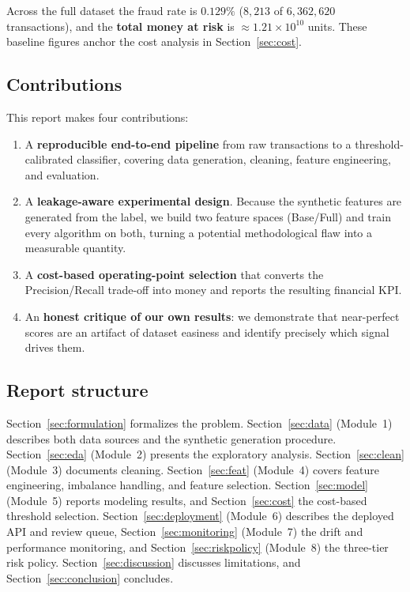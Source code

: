\documentclass{article}
\begin{document}
Across the full dataset the fraud rate is $0.129\%$ ($8{,}213$ of
$6{,}362{,}620$ transactions), and the \textbf{total money at risk} is
$\approx 1.21\times 10^{10}$ units. These baseline figures anchor the
cost analysis in Section~\ref{sec:cost}.

\subsection{Contributions}
This report makes four contributions:
\begin{enumerate}
    \item A \textbf{reproducible end-to-end pipeline} from raw
    transactions to a threshold-calibrated classifier, covering data
    generation, cleaning, feature engineering, and evaluation.
    \item A \textbf{leakage-aware experimental design}. Because the
    synthetic features are generated from the label, we build two
    feature spaces (Base/Full) and train every algorithm on both,
    turning a potential methodological flaw into a measurable quantity.
    \item A \textbf{cost-based operating-point selection} that converts
    the Precision/Recall trade-off into money and reports the resulting
    financial KPI.
    \item An \textbf{honest critique of our own results}: we
    demonstrate that near-perfect scores are an artifact of dataset
    easiness and identify precisely which signal drives them.
\end{enumerate}

\subsection{Report structure}
Section~\ref{sec:formulation} formalizes the problem.
Section~\ref{sec:data} (Module~1) describes both data sources and the
synthetic generation procedure. Section~\ref{sec:eda} (Module~2)
presents the exploratory analysis. Section~\ref{sec:clean} (Module~3)
documents cleaning. Section~\ref{sec:feat} (Module~4) covers feature
engineering, imbalance handling, and feature selection.
Section~\ref{sec:model} (Module~5) reports modeling results, and
Section~\ref{sec:cost} the cost-based threshold selection.
Section~\ref{sec:deployment} (Module~6) describes the deployed API and
review queue, Section~\ref{sec:monitoring} (Module~7) the drift and
performance monitoring, and Section~\ref{sec:riskpolicy} (Module~8) the
three-tier risk policy. Section~\ref{sec:discussion} discusses
limitations, and Section~\ref{sec:conclusion} concludes.
\end{document}
